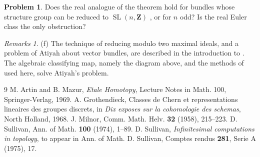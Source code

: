 \documentclass[11pt]{amsart}
\theoremstyle{plain}
\theoremstyle{definition}
\newtheorem*{problem*}{Problem}
\theoremstyle{remark}
\newtheorem*{remarks*}{Remarks}
\providecommand{\Z}{\mathbf Z}
\begin{document}
\begin{problem*}
Does the real analogue of the theorem hold for bundles whose structure group can be reduced to $\operatorname{SL}(n,\Z)$ \cite{SullivanCR}, or for $n$ odd? Is the real Euler class the only obstruction?
\end{problem*}

\begin{remarks*}
(f) The technique of reducing modulo two maximal ideals, and a problem of Atiyah about vector bundles, are described in the introduction to \cite{ArtinMazur}. The algebraic classifying map, namely the diagram above, and the methods of \cite{SullivanInf} used here, solve Atiyah's problem.
\end{remarks*}

\begin{thebibliography}{9}
 M. Artin and B. Mazur, \emph{Etale Homotopy}, Lecture Notes in Math. 100, Springer-Verlag, 1969.
 A. Grothendieck, Classes de Chern et representations lineaires des groupes discrets, in \emph{Dix exposes sur la cohomologie des schemas}, North Holland, 1968.
 J. Milnor, Comm. Math. Helv. \textbf{32} (1958), 215--223.
 D. Sullivan, Ann. of Math. \textbf{100} (1974), 1--89.
 D. Sullivan, \emph{Infinitesimal computations in topology}, to appear in Ann. of Math.
 D. Sullivan, Comptes rendus \textbf{281}, Serie A (1975), 17.
\end{thebibliography}
\end{document}
